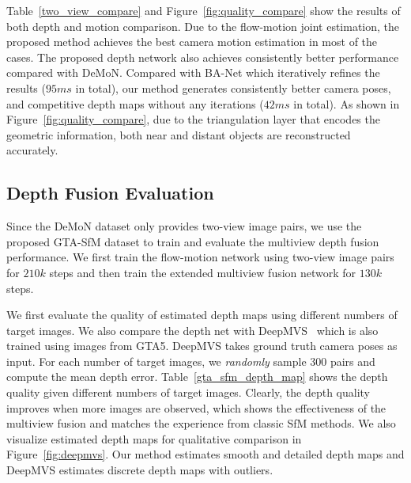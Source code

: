 \documentclass[letterpaper, 10 pt, conference]{ieeeconf}  %
\begin{document}
Table~\ref{two_view_compare} and Figure~\ref{fig:quality_compare} show the results of both depth and motion comparison. Due to the flow-motion joint estimation, the proposed method achieves the best camera motion estimation in most of the cases. The proposed depth network also achieves consistently better performance compared with DeMoN. Compared with BA-Net which iteratively refines the results ($95ms$ in total), our method generates consistently better camera poses, and competitive depth maps without any iterations ($42ms$ in total). As shown in Figure~\ref{fig:quality_compare}, due to the triangulation layer that encodes the geometric information, both near and distant objects are reconstructed accurately.

\subsection{Depth Fusion Evaluation}
 
Since the DeMoN dataset only provides two-view image pairs, we use the proposed GTA-SfM dataset to train and evaluate the multiview depth fusion performance. We first train the flow-motion network using two-view image pairs for $210k$ steps and then train the extended multiview fusion network for $130k$ steps. 
 
We first evaluate the quality of estimated depth maps using different numbers of target images. We also compare the depth net with DeepMVS~\cite{DeepMVS} which is also trained using images from GTA5. DeepMVS takes ground truth camera poses as input. For each number of target images, we \textit{randomly} sample $300$ pairs and compute the mean depth error. Table~\ref{gta_sfm_depth_map} shows the depth quality given different numbers of target images. Clearly, the depth quality improves when more images are observed, which shows the effectiveness of the multiview fusion and matches the experience from classic SfM methods. We also visualize estimated depth maps for qualitative comparison in Figure~\ref{fig:deepmvs}. Our method estimates smooth and detailed depth maps and DeepMVS estimates discrete depth maps with outliers.
 
\end{document}
